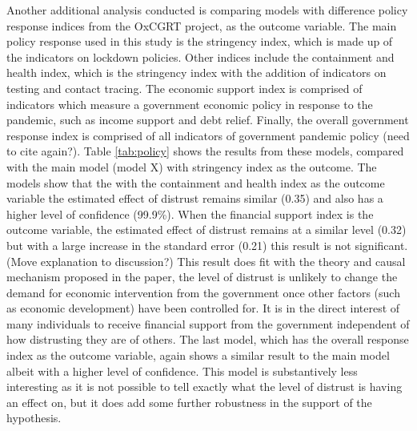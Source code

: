 \documentclass[
  11pt,
]{article}
\begin{document}
Another additional analysis conducted is comparing models with difference policy response indices from the OxCGRT project, as the outcome variable. The main policy response used in this study is the stringency index, which is made up of the indicators on lockdown policies. Other indices include the containment and health index, which is the stringency index with the addition of indicators on testing and contact tracing. The economic support index is comprised of indicators which measure a government economic policy in response to the pandemic, such as income support and debt relief. Finally, the overall government response index is comprised of all indicators of government pandemic policy (need to cite again?). Table \ref{tab:policy} shows the results from these models, compared with the main model (model X) with stringency index as the outcome. The models show that the with the containment and health index as the outcome variable the estimated effect of distrust remains similar (0.35) and also has a higher level of confidence (99.9\%). When the financial support index is the outcome variable, the estimated effect of distrust remains at a similar level (0.32) but with a large increase in the standard error (0.21) this result is not significant. (Move explanation to discussion?) This result does fit with the theory and causal mechanism proposed in the paper, the level of distrust is unlikely to change the demand for economic intervention from the government once other factors (such as economic development) have been controlled for. It is in the direct interest of many individuals to receive financial support from the government independent of how distrusting they are of others. The last model, which has the overall response index as the outcome variable, again shows a similar result to the main model albeit with a higher level of confidence. This model is substantively less interesting as it is not possible to tell exactly what the level of distrust is having an effect on, but it does add some further robustness in the support of the hypothesis.\\
\end{document}
